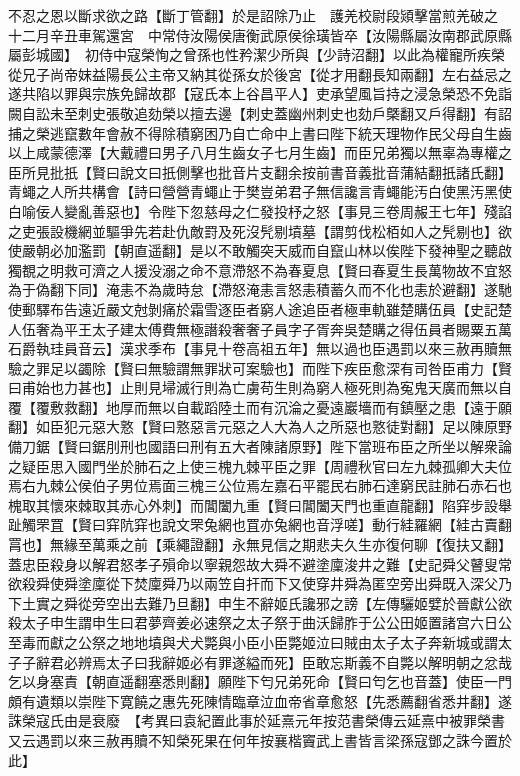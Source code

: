 不忍之恩以斷求欲之路【斷丁管翻】於是詔除乃止　護羌校尉段熲擊當煎羌破之　十二月辛丑車駕還宮　中常侍汝陽侯唐衡武原侯徐璜皆卒【汝陽縣屬汝南郡武原縣屬彭城國】　初侍中寇榮恂之曾孫也性矜潔少所與【少詩沼翻】以此為權寵所疾榮從兄子尚帝妺益陽長公主帝又納其從孫女於後宮【從才用翻長知兩翻】左右益忌之遂共陷以罪與宗族免歸故郡【寇氏本上谷昌平人】吏承望風旨持之浸急榮恐不免詣闕自訟未至刺史張敬追劾榮以擅去邊【刺史蓋幽州刺史也劾戶槩翻又戶得翻】有詔捕之榮逃竄數年會赦不得除積窮困乃自亡命中上書曰陛下統天理物作民父母自生齒以上咸蒙德澤【大戴禮曰男子八月生齒女子七月生齒】而臣兄弟獨以無辜為專權之臣所見批扺【賢曰說文曰扺側擊也批音片支翻余按前書音義批音蒲結翻扺諸氏翻】青蠅之人所共構會【詩曰營營青蠅止于樊豈弟君子無信讒言青蠅能汚白使黑汚黑使白喻佞人變亂善惡也】令陛下忽慈母之仁發投杼之怒【事見三卷周赧王七年】殘諂之吏張設機網並驅爭先若赴仇敵罸及死沒髠剔墳墓【謂剪伐松栢如人之髠剔也】欲使嚴朝必加濫罰【朝直遥翻】是以不敢觸突天威而自竄山林以俟陛下發神聖之聽啟獨覩之明救可濟之人援没溺之命不意滯怒不為春夏息【賢曰春夏生長萬物故不宜怒為于偽翻下同】淹恚不為歲時怠【滯怒淹恚言怒恚積蓄久而不化也恚於避翻】遂馳使郵驛布告遠近嚴文尅剝痛於霜雪逐臣者窮人途追臣者極車軌雖楚購伍員【史記楚人伍奢為平王太子建太傅費無極譖殺奢奢子員字子胥奔吳楚購之得伍員者賜粟五萬石爵執珪員音云】漢求季布【事見十卷高祖五年】無以過也臣遇罰以來三赦再贖無驗之罪足以蠲除【賢曰無驗謂無罪狀可案驗也】而陛下疾臣愈深有司咎臣甫力【賢曰甫始也力甚也】止則見埽滅行則為亡虜苟生則為窮人極死則為寃鬼天廣而無以自覆【覆敷救翻】地厚而無以自載蹈陸土而有沉淪之憂遠巖墻而有鎮壓之患【遠于願翻】如臣犯元惡大憝【賢曰憝惡言元惡之人大為人之所惡也憝徒對翻】足以陳原野備刀鋸【賢曰鋸刖刑也國語曰刑有五大者陳諸原野】陛下當班布臣之所坐以解衆論之疑臣思入國門坐於肺石之上使三槐九棘平臣之罪【周禮秋官曰左九棘孤卿大夫位焉右九棘公侯伯子男位焉面三槐三公位焉左嘉石平罷民右肺石達窮民註肺石赤石也槐取其懷來棘取其赤心外刺】而閶闔九重【賢曰閶闔天門也重直龍翻】陷穽步設舉趾觸罘罝【賢曰穽阬穽也說文罘兔網也罝亦兔網也音浮嗟】動行絓羅網【絓古賣翻罥也】無緣至萬乘之前【乘繩證翻】永無見信之期悲夫久生亦復何聊【復扶又翻】蓋忠臣殺身以解君怒孝子殞命以寧親怨故大舜不避塗廩浚井之難【史記舜父瞽叟常欲殺舜使舜塗廩從下焚廩舜乃以兩笠自扞而下又使穿井舜為匿空旁出舜既入深父乃下土實之舜從旁空出去難乃旦翻】申生不辭姬氏讒邪之謗【左傳驪姬嬖於晉獻公欲殺太子申生謂申生曰君夢齊姜必速祭之太子祭于曲沃歸胙于公公田姬置諸宫六日公至毒而獻之公祭之地地墳與犬犬斃與小臣小臣斃姬泣曰賊由太子太子奔新城或謂太子子辭君必辨焉太子曰我辭姬必有罪遂縊而死】臣敢忘斯義不自斃以解明朝之忿哉乞以身塞責【朝直遥翻塞悉則翻】願陛下匄兄弟死命【賢曰匄乞也音蓋】使臣一門頗有遺類以崇陛下寛饒之惠先死陳情臨章泣血帝省章愈怒【先悉薦翻省悉井翻】遂誅榮寇氏由是衰廢　【考異曰袁紀置此事於延熹元年按范書榮傳云延熹中被罪榮書又云遇罰以來三赦再贖不知榮死果在何年按襄楷竇武上書皆言梁孫寇鄧之誅今置於此】

